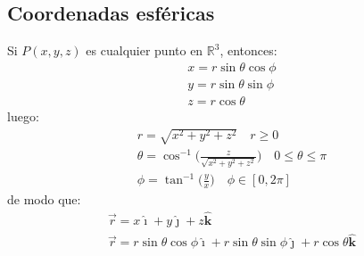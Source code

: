 \documentclass[a4paper]{article}
\newcommand{\ihat}{\boldsymbol{\hat{\imath}}}
\newcommand{\jhat}{\boldsymbol{\hat{\jmath}}}
\newcommand{\khat}{\boldsymbol{\hat{\bm{k}}}}
\begin{document}
\subsection{Coordenadas esféricas}
Si $P(x,y,z)$ es cualquier punto en $\mathbb{R}^3$, entonces:
\begin{gather*}
x=r\sin\theta\cos\phi\\
y=r\sin\theta\sin\phi\\
z=r\cos\theta 
\end{gather*}
luego:
\begin{gather*}
r=\sqrt{x^2+y^2+z^2}\quad r\geq 0\\
\theta=\cos^{-1}\Bigg(\frac{z}{\sqrt{x^2+y^2+z^2}}\Bigg)\quad 0\leq\theta\leq\pi\\
\phi=\tan^{-1}\Big(\frac{y}{x}\Big)\quad\phi\in[0,2\pi] 
\end{gather*}
de modo que:
\begin{gather}
\tag{Sistema cartesiano}
\vec{r}=x\ihat+y\jhat+z\khat\\
\tag{Sistema esférico}
\vec{r}=r\sin\theta\cos\phi\ihat+r\sin\theta\sin\phi\jhat+r\cos\theta\khat 
\end{gather}
\end{document}
